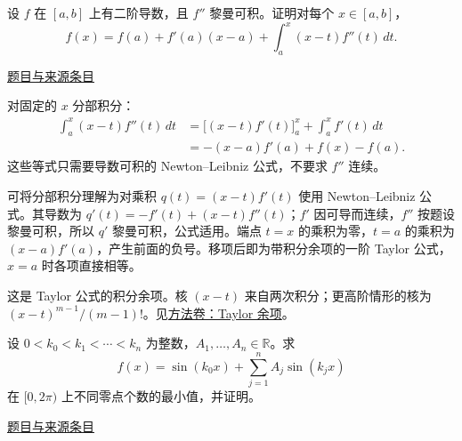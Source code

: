 \documentclass[UTF8,12pt,a4paper,fontset=fandol]{ctexart}
\begin{document}
\begin{example}[来源序号2]\label{ex:fin03-all:2}\label{pr:fin03-all:2}

设 $f$ 在 $[a,b]$ 上有二阶导数，且 $f''$ 黎曼可积。证明对每个 $x\in[a,b]$，
\[
f(x)=f(a)+f'(a)(x-a)+\int_a^x(x-t)f''(t)\,dt.
\]

\par\href{https://github.com/lzxcr/cmc-mathematics/blob/64916fa1fdbc3e444a652eca204d5669058ee321/src/problems/finals/03/02.md}{题目与来源条目}

\end{example}

\begin{solve}\label{ans:fin03-all:2}

对固定的 $x$ 分部积分：
\[
\begin{aligned}
\int_a^x(x-t)f''(t)\,dt
&=\bigl[(x-t)f'(t)\bigr]_a^x+\int_a^x f'(t)\,dt\\
&=-(x-a)f'(a)+f(x)-f(a).
\end{aligned}
\]
这些等式只需要导数可积的 Newton--Leibniz 公式，不要求 $f''$ 连续。

可将分部积分理解为对乘积 $q(t)=(x-t)f'(t)$ 使用 Newton--Leibniz 公式。其导数为 $q'(t)=-f'(t)+(x-t)f''(t)$；$f'$ 因可导而连续，$f''$ 按题设黎曼可积，所以 $q'$ 黎曼可积，公式适用。端点 $t=x$ 的乘积为零，$t=a$ 的乘积为 $(x-a)f'(a)$，产生前面的负号。移项后即为带积分余项的一阶 Taylor 公式，$x=a$ 时各项直接相等。

\end{solve}

\begin{remark}[方法与条件]这是 Taylor 公式的积分余项。核 $(x-t)$ 来自两次积分；更高阶情形的核为 $(x-t)^{m-1}/(m-1)!$。见\hyperref[app:estimate-taylor]{方法卷：Taylor 余项}。\end{remark}

\begin{example}[来源序号3]\label{ex:fin03-all:3}\label{pr:fin03-all:3}

设 $0<k_0<k_1<\cdots<k_n$ 为整数，$A_1,\ldots,A_n\in\mathbb R$。求
\[
f(x)=\sin(k_0x)+\sum_{j=1}^n A_j\sin(k_jx)
\]
在 $[0,2\pi)$ 上不同零点个数的最小值，并证明。

\par\href{https://github.com/lzxcr/cmc-mathematics/blob/64916fa1fdbc3e444a652eca204d5669058ee321/src/problems/finals/03/03.md}{题目与来源条目}

\end{example}
\end{document}
